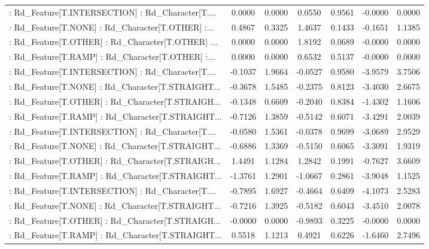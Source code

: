 \begin{longtable}{p{4cm}cccccc}
 : Rd\_Feature[T.INTERSECTION] : Rd\_Character[T.... &  0.0000 &    0.0000 &  0.0550 &       0.9561 & -0.0000 &  0.0000 \\
 : Rd\_Feature[T.NONE] : Rd\_Character[T.OTHER] :... &  0.4867 &    0.3325 &  1.4637 &       0.1433 & -0.1651 &  1.1385 \\
 : Rd\_Feature[T.OTHER] : Rd\_Character[T.OTHER] ... &  0.0000 &    0.0000 &  1.8192 &       0.0689 & -0.0000 &  0.0000 \\
 : Rd\_Feature[T.RAMP] : Rd\_Character[T.OTHER] :... &  0.0000 &    0.0000 &  0.6532 &       0.5137 & -0.0000 &  0.0000 \\
 : Rd\_Feature[T.INTERSECTION] : Rd\_Character[T.... & -0.1037 &    1.9664 & -0.0527 &       0.9580 & -3.9579 &  3.7506 \\
 : Rd\_Feature[T.NONE] : Rd\_Character[T.STRAIGHT... & -0.3678 &    1.5485 & -0.2375 &       0.8123 & -3.4030 &  2.6675 \\
 : Rd\_Feature[T.OTHER] : Rd\_Character[T.STRAIGH... & -0.1348 &    0.6609 & -0.2040 &       0.8384 & -1.4302 &  1.1606 \\
 : Rd\_Feature[T.RAMP] : Rd\_Character[T.STRAIGHT... & -0.7126 &    1.3859 & -0.5142 &       0.6071 & -3.4291 &  2.0039 \\
 : Rd\_Feature[T.INTERSECTION] : Rd\_Character[T.... & -0.0580 &    1.5361 & -0.0378 &       0.9699 & -3.0689 &  2.9529 \\
 : Rd\_Feature[T.NONE] : Rd\_Character[T.STRAIGHT... & -0.6886 &    1.3369 & -0.5150 &       0.6065 & -3.3091 &  1.9319 \\
 : Rd\_Feature[T.OTHER] : Rd\_Character[T.STRAIGH... &  1.4491 &    1.1284 &  1.2842 &       0.1991 & -0.7627 &  3.6609 \\
 : Rd\_Feature[T.RAMP] : Rd\_Character[T.STRAIGHT... & -1.3761 &    1.2901 & -1.0667 &       0.2861 & -3.9048 &  1.1525 \\
 : Rd\_Feature[T.INTERSECTION] : Rd\_Character[T.... & -0.7895 &    1.6927 & -0.4664 &       0.6409 & -4.1073 &  2.5283 \\
 : Rd\_Feature[T.NONE] : Rd\_Character[T.STRAIGHT... & -0.7216 &    1.3925 & -0.5182 &       0.6043 & -3.4510 &  2.0078 \\
 : Rd\_Feature[T.OTHER] : Rd\_Character[T.STRAIGH... & -0.0000 &    0.0000 & -0.9893 &       0.3225 & -0.0000 &  0.0000 \\
 : Rd\_Feature[T.RAMP] : Rd\_Character[T.STRAIGHT... &  0.5518 &    1.1213 &  0.4921 &       0.6226 & -1.6460 &  2.7496 \\

\end{longtable}
